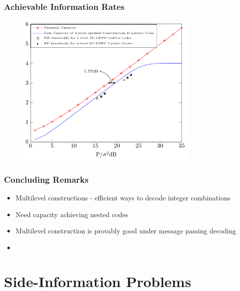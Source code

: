\documentclass[10pt]{beamer}
\begin{document}
\begin{frame}\frametitle{Achievable Information Rates}
    \begin{figure}
        \begin{center}
            \includegraphics[width=3.5in]{ShapingLoss_Final_CTW.pdf}
        \end{center}
    \end{figure}
\end{frame}

\begin{frame}\frametitle{Concluding Remarks}
    \begin{itemize}
        \item Multilevel constructions - efficient ways to decode integer combinations
               \vspace{5pt}
        \item Need capacity achieving nested codes
                \vspace{5pt}
        \item Multilevel construction is provably good under message passing decoding
               \vspace{5pt}
               \pause
        \item {}
    \end{itemize}
\end{frame}

\section{Side-Information Problems}
\end{document}
